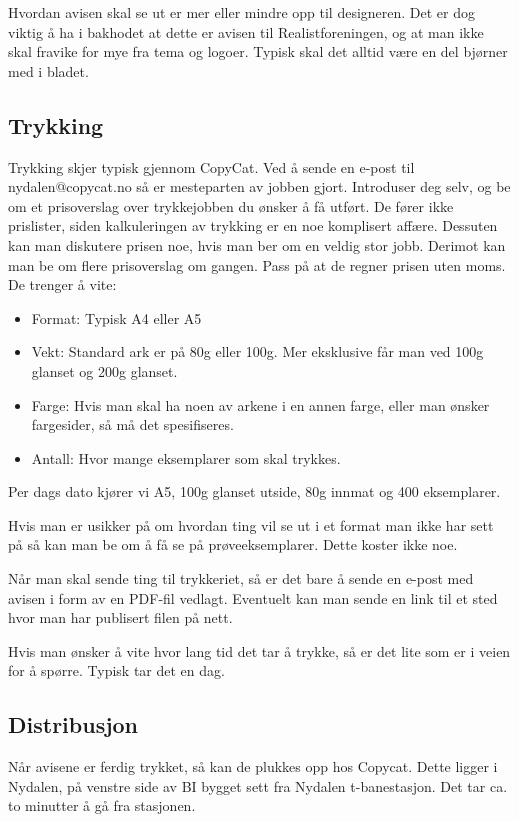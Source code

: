  Hvordan avisen skal se ut er mer eller mindre opp til designeren. Det
er dog viktig å ha i bakhodet at dette er avisen til
Realistforeningen, og at man ikke skal fravike for mye fra tema og
logoer. Typisk skal det alltid være en del bjørner med i bladet.

\subsection{Trykking}
 Trykking skjer typisk gjennom CopyCat. Ved å sende en e-post til
nydalen@copycat.no så er mesteparten av jobben gjort. Introduser deg
selv, og be om et prisoverslag over trykkejobben du ønsker å få
utført. De fører ikke prislister, siden kalkuleringen av trykking er
en noe komplisert affære. Dessuten kan man diskutere prisen noe, hvis
man ber om en veldig stor jobb. Derimot kan man be om flere
prisoverslag om gangen. Pass på at de regner prisen uten moms. De
trenger å vite:

\begin{itemize}
 \item Format: Typisk A4 eller A5
 \item Vekt: Standard ark er på 80g eller 100g. Mer eksklusive får man ved
100g glanset og 200g glanset.
 \item Farge: Hvis man skal ha noen av arkene i en annen farge, eller man
ønsker fargesider, så må det spesifiseres.
 \item Antall: Hvor mange eksemplarer som skal trykkes.
\end{itemize}

 Per dags dato kjører vi A5, 100g glanset utside, 80g innmat og 400 eksemplarer.

 Hvis man er usikker på om hvordan ting vil se ut i et format man ikke
har sett på så kan man be om å få se på prøveeksemplarer. Dette koster
ikke noe.

 Når man skal sende ting til trykkeriet, så er det bare å sende en
e-post med avisen i form av en PDF-fil vedlagt. Eventuelt kan man
sende en link til et sted hvor man har publisert filen på nett.

 Hvis man ønsker å vite hvor lang tid det tar å trykke, så er det lite
som er i veien for å spørre. Typisk tar det en dag.

\subsection{Distribusjon}
 Når avisene er ferdig trykket, så kan de plukkes opp hos Copycat.
Dette ligger i Nydalen, på venstre side av BI bygget sett fra Nydalen
t-banestasjon. Det tar ca. to minutter å gå fra stasjonen.

